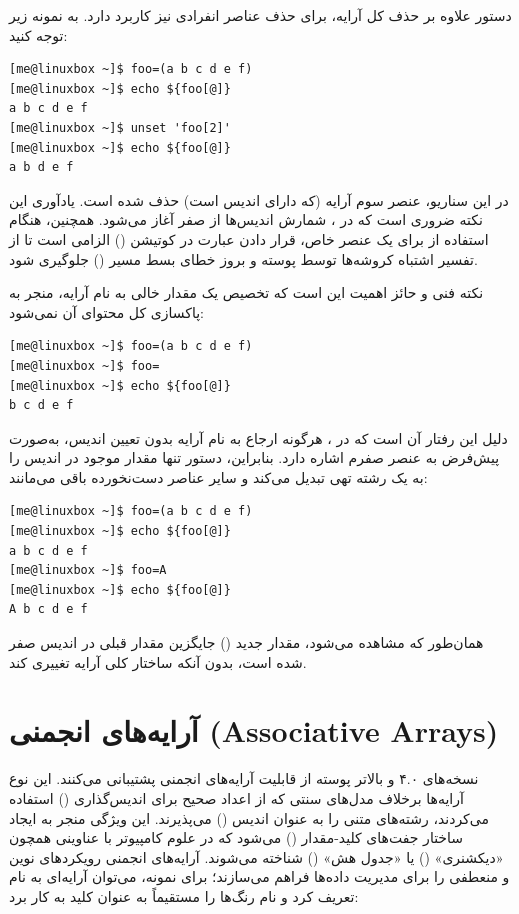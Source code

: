 دستور  علاوه بر حذف کل آرایه، برای حذف عناصر انفرادی نیز کاربرد دارد. به نمونه زیر توجه کنید:

\begin{latin}
\begin{lstlisting}
[me@linuxbox ~]$ foo=(a b c d e f)
[me@linuxbox ~]$ echo ${foo[@]}
a b c d e f
[me@linuxbox ~]$ unset 'foo[2]'
[me@linuxbox ~]$ echo ${foo[@]}
a b d e f
\end{lstlisting}
\end{latin}

در این سناریو، عنصر سوم آرایه (که دارای اندیس  است) حذف شده است. یادآوری این نکته ضروری است که در ، شمارش اندیس‌ها از صفر آغاز می‌شود. همچنین، هنگام استفاده از  برای یک عنصر خاص، قرار دادن عبارت در کوتیشن () الزامی است تا از تفسیر اشتباه کروشه‌ها توسط پوسته و بروز خطای بسط مسیر () جلوگیری شود.

نکته فنی و حائز اهمیت این است که تخصیص یک مقدار خالی به نام آرایه، منجر به پاکسازی کل محتوای آن نمی‌شود:

\begin{latin}
\begin{lstlisting}
[me@linuxbox ~]$ foo=(a b c d e f)
[me@linuxbox ~]$ foo=
[me@linuxbox ~]$ echo ${foo[@]}
b c d e f
\end{lstlisting}
\end{latin}

دلیل این رفتار آن است که در ، هرگونه ارجاع به نام آرایه بدون تعیین اندیس، به‌صورت پیش‌فرض به عنصر صفرم اشاره دارد. بنابراین، دستور  تنها مقدار موجود در اندیس  را به یک رشته تهی تبدیل می‌کند و سایر عناصر دست‌نخورده باقی می‌مانند:

\begin{latin}
\begin{lstlisting}
[me@linuxbox ~]$ foo=(a b c d e f)
[me@linuxbox ~]$ echo ${foo[@]}
a b c d e f
[me@linuxbox ~]$ foo=A
[me@linuxbox ~]$ echo ${foo[@]}
A b c d e f
\end{lstlisting}
\end{latin}

همان‌طور که مشاهده می‌شود، مقدار جدید () جایگزین مقدار قبلی در اندیس صفر شده است، بدون آنکه ساختار کلی آرایه تغییری کند.

\section{آرایه‌های انجمنی (Associative Arrays)}

نسخه‌های ۴.۰ و بالاتر پوسته  از قابلیت آرایه‌های انجمنی پشتیبانی می‌کنند. این نوع آرایه‌ها برخلاف مدل‌های سنتی که از اعداد صحیح برای اندیس‌گذاری () استفاده می‌کردند، رشته‌های متنی را به عنوان اندیس () می‌پذیرند. این ویژگی منجر به ایجاد ساختار جفت‌های کلید-مقدار () می‌شود که در علوم کامپیوتر با عناوینی همچون «دیکشنری» () یا «جدول هش» () شناخته می‌شوند. آرایه‌های انجمنی رویکردهای نوین و منعطفی را برای مدیریت داده‌ها فراهم می‌سازند؛ برای نمونه، می‌توان آرایه‌ای به نام  تعریف کرد و نام رنگ‌ها را مستقیماً به عنوان کلید به کار برد:

